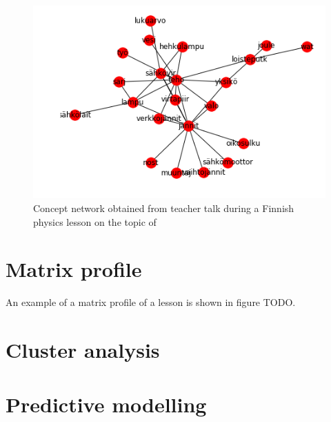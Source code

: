 \documentclass[utf8,english]{gradu3}
\begin{document}
\begin{figure}
  \includegraphics[width=\linewidth]{../figures/graph1.png}
  \caption{Concept network obtained from teacher talk during a Finnish physics lesson on the topic of }
  \label{fig:graph1}
\end{figure}

\section{Matrix profile}

An example of a matrix profile of a lesson is shown in figure TODO.




\section{Cluster analysis}





\section{Predictive modelling}
\end{document}
